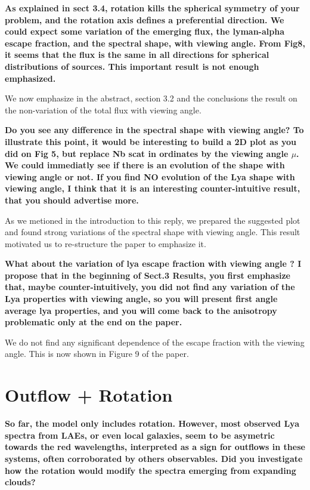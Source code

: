 \documentclass[12pt]{article}
\begin{document}
{\bf As explained in sect 3.4, rotation kills the spherical symmetry
  of your problem, and the rotation axis defines a preferential
  direction. We could expect some variation of the emerging flux, the
  lyman-alpha escape fraction, and the spectral shape, with viewing
  angle. From Fig8, it seems that the flux is the same in all
  directions for spherical distributions of sources. This important
  result is not enough emphasized.} 

We now emphasize in the abstract, section 3.2 and the conclusions the
result on the non-variation of the total flux with viewing angle.

{\bf Do you see any difference in the spectral shape with viewing
  angle? To illustrate this point, it would be interesting to build a
  2D plot as you did on Fig 5, but replace Nb scat in ordinates by the
  viewing angle $\mu$. We could immediatly see if there is an
  evolution of the shape with viewing angle or not. If you find NO
  evolution of the Lya shape with viewing angle, I think that it is an
  interesting counter-intuitive result, that you should advertise
  more.} 

As we metioned in the introduction to this reply, we prepared the
suggested plot and found strong variations of the spectral shape with
viewing angle. This result motivated us to re-structure the paper to
emphasize it.


{\bf What about the variation of lya escape fraction with viewing
  angle ? I propose that in the beginning of Sect.3 Results, you first
  emphasize that, maybe counter-intuitively, you did not find any
  variation of the Lya properties with viewing angle, so you will
  present first angle average lya properties, and you will come back
  to the anisotropy problematic only at the end on the paper.} 

We do not find any significant dependence of the escape fraction with
the viewing angle. This is now shown in Figure 9 of the paper. 




\section*{Outflow + Rotation}

{\bf So far, the model only includes rotation. However, most observed
  Lya spectra from LAEs, or even local galaxies, seem to be asymetric
  towards the red wavelengths, interpreted as a sign for outflows in
  these systems, often corroborated by others observables. Did you
  investigate how the rotation would modify the spectra emerging from
  expanding clouds?} 
\end{document}
